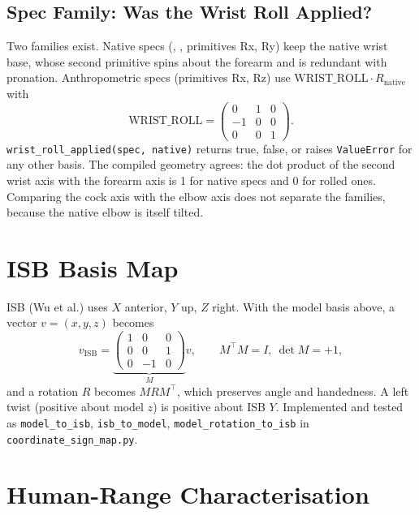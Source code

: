 \documentclass[11pt,a4paper]{article}
\begin{document}
\subsection{Spec Family: Was the Wrist Roll Applied?}
Two families exist.  Native specs (, ,
primitives Rx, Ry) keep the native wrist base, whose second primitive spins
about the forearm and is redundant with pronation.  Anthropometric specs
(primitives Rx, Rz) use $\mathrm{WRIST\_ROLL}\cdot R_{\mathrm{native}}$ with
\begin{equation}
\mathrm{WRIST\_ROLL}=\begin{pmatrix}0&1&0\\-1&0&0\\0&0&1\end{pmatrix}.
\end{equation}
\texttt{wrist\_roll\_applied(spec, native)} returns true, false, or raises
\texttt{ValueError} for any other basis.  The compiled geometry agrees: the
dot product of the second wrist axis with the forearm axis is 1 for native
specs and 0 for rolled ones.  Comparing the cock axis with the elbow axis does
not separate the families, because the native elbow is itself tilted.

\section{ISB Basis Map}
\label{sec:isb}

ISB (Wu et al.) uses $X$ anterior, $Y$ up, $Z$ right.  With the model basis
above, a vector $v=(x,y,z)$ becomes
\begin{equation}
v_{\mathrm{ISB}}=\underbrace{\begin{pmatrix}1&0&0\\0&0&1\\0&-1&0\end{pmatrix}}_{M}v,
\qquad M^{\top}M=I,\ \det M=+1,
\end{equation}
and a rotation $R$ becomes $MRM^{\top}$, which preserves angle and
handedness.  A left twist (positive about model $z$) is positive about ISB $Y$.
Implemented and tested as \texttt{model\_to\_isb}, \texttt{isb\_to\_model},
\texttt{model\_rotation\_to\_isb} in \texttt{coordinate\_sign\_map.py}.

\section{Human-Range Characterisation}
\label{sec:ranges}
\end{document}

